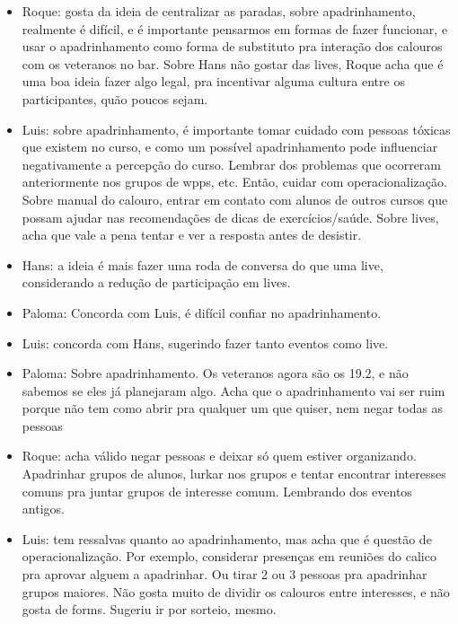 \documentclass{ata-calico}
\begin{document}
\begin{itemize}
\item Roque: gosta da ideia de centralizar as paradas, sobre apadrinhamento, realmente é difícil, e é importante pensarmos em formas de fazer funcionar, e usar o apadrinhamento como forma de
substituto pra interação dos calouros com os veteranos no bar. Sobre Hans não gostar das lives, Roque acha que é uma boa ideia fazer algo legal, pra incentivar alguma cultura entre os  participantes, quão poucos sejam.

\item Luis: sobre apadrinhamento, é importante tomar cuidado com pessoas tóxicas que existem no curso, e como um possível apadrinhamento pode influenciar negativamente a percepção do curso. Lembrar dos problemas que ocorreram anteriormente nos grupos de wpps, etc. Então, cuidar com operacionalização.
Sobre manual do calouro, entrar em contato com alunos de outros cursos que possam ajudar nas recomendações de dicas de exercícios/saúde.
Sobre lives, acha que vale a pena tentar e ver a resposta antes de desistir.

\item Hans: a ideia é mais fazer uma roda de conversa do que uma live, considerando a redução de participação em lives.

\item Paloma: Concorda com Luis, é difícil confiar no apadrinhamento.

\item Luis: concorda com Hans, sugerindo fazer tanto eventos como live. 

\item Paloma: Sobre apadrinhamento. Os veteranos agora são os 19.2, e não sabemos se eles já planejaram algo. Acha que o apadrinhamento vai ser ruim porque não tem como abrir pra qualquer um que quiser, nem negar todas as pessoas

\item Roque: acha válido negar pessoas e deixar só quem estiver organizando. Apadrinhar grupos de alunos, lurkar nos grupos e tentar encontrar interesses comuns pra juntar grupos de interesse comum. Lembrando dos eventos antigos.

\item Luis: tem ressalvas quanto ao apadrinhamento, mas acha que é questão de operacionalização. Por exemplo, considerar presenças em reuniões do calico pra aprovar alguem a apadrinhar. Ou tirar 2 ou 3  pessoas pra apadrinhar grupos maiores. Não gosta muito de dividir os calouros entre interesses, e não gosta de forms. Sugeriu ir por sorteio, mesmo.


\end{itemize}
\end{document}
